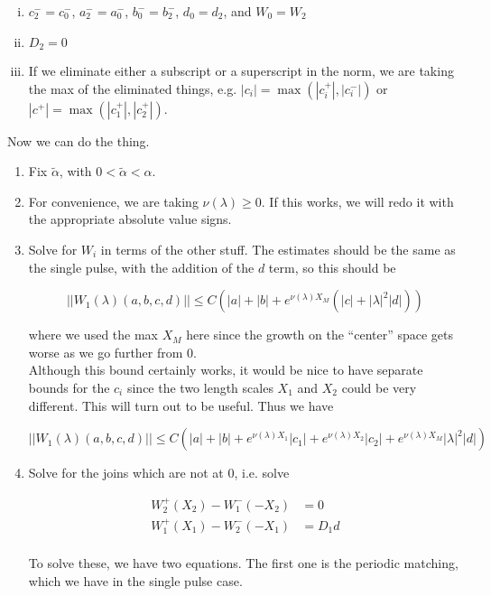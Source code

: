 \documentclass[12pt]{article}
\begin{document}
\begin{enumerate}[(i)]
\item $c_2^- = c_0^-$, $a_2^- = a_0^-$, $b_0^- = b_2^-$, $d_0 = d_2$, and $W_0 = W_2$
\item $D_2 = 0$
\item If we eliminate either a subscript or a superscript in the norm, we are taking the max of the eliminated things, e.g. $|c_i| = \max(|c_i^+|, |c_i^-|)$ or $|c^+| = \max(|c_1^+|, |c_2^+|)$. 
\end{enumerate}

Now we can do the thing.

\begin{enumerate}

\item Fix $\tilde{\alpha}$, with $0 < \tilde{\alpha} < \alpha$. 

\item For convenience, we are taking $\nu(\lambda) \geq 0$. If this works, we will redo it with the appropriate absolute value signs.

\item Solve for $W_i$ in terms of the other stuff. The estimates should be the same as the single pulse, with the addition of the $d$ term, so this should be

\[
||W_1(\lambda)(a,b,c,d)|| \leq C (|a| + |b| + e^{\nu(\lambda)X_M}(|c| + |\lambda|^2 |d| ))
\]

where we used the max $X_M$ here since the growth on the ``center'' space gets worse as we go further from 0.\\

Although this bound certainly works, it would be nice to have separate bounds for the $c_i$ since the two length scales $X_1$ and $X_2$ could be very different. This will turn out to be useful. Thus we have 

\[
||W_1(\lambda)(a,b,c,d)|| \leq C (|a| + |b| + e^{\nu(\lambda)X_1}|c_1| + e^{\nu(\lambda)X_2}|c_2| + e^{\nu(\lambda)X_M}|\lambda|^2 |d| )
\]

\item Solve for the joins which are not at 0, i.e. solve

\begin{align*}
W_2^+(X_2) - W_1^-(-X_2) &= 0 \\
W_1^+(X_1) - W_2^-(-X_1) &= D_1 d \\
\end{align*}

To solve these, we have two equations. The first one is the periodic matching, which we have in the single pulse case.


\end{enumerate}
\end{document}
